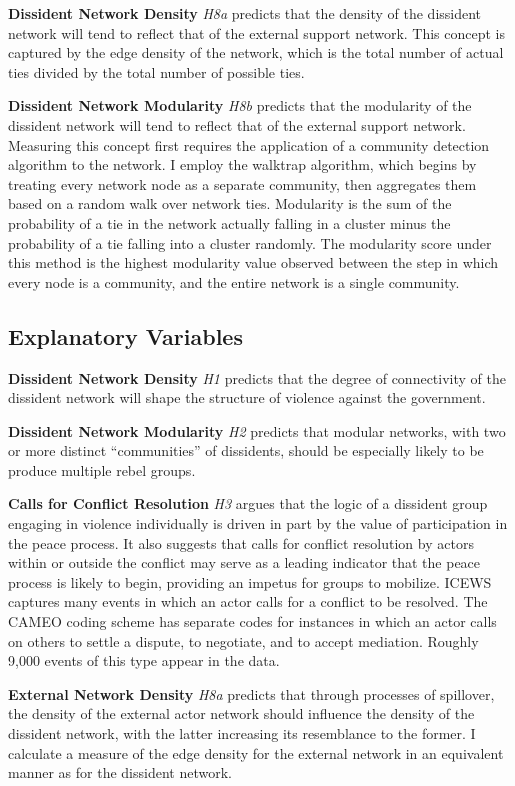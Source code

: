 \textbf{Dissident Network Density} \textit{H8a} predicts that the density of the dissident network will tend to reflect that of the external support network. This concept is captured by the edge density of the network, which is the total number of actual ties divided by the total number of possible ties.

\textbf{Dissident Network Modularity} \textit{H8b} predicts that the modularity of the dissident network will tend to reflect that of the external support network. Measuring this concept first requires the application of a community detection algorithm to the network. I employ the walktrap algorithm, which begins by treating every network node as a separate community, then aggregates them based on a random walk over network ties. Modularity is the sum of the probability of a tie in the network actually falling in a cluster minus the probability of a tie falling into a cluster randomly. The modularity score under this method is the highest modularity value observed between the step in which every node is a community, and the entire network is a single community.

\subsection{Explanatory Variables}

\textbf{Dissident Network Density} \textit{H1} predicts that the degree of connectivity of the dissident network will shape the structure of violence against the government.

\textbf{Dissident Network Modularity} \textit{H2} predicts that modular networks, with two or more distinct ``communities'' of dissidents, should be especially likely to be produce multiple rebel groups.

\textbf{Calls for Conflict Resolution} \textit{H3} argues that the logic of a dissident group engaging in violence individually is driven in part by the value of participation in the peace process. It also suggests that calls for conflict resolution by actors within or outside the conflict may serve as a leading indicator that the peace process is likely to begin, providing an impetus for groups to mobilize. ICEWS captures many events in which an actor calls for a conflict to be resolved. The CAMEO coding scheme has separate codes for instances in which an actor calls on others to settle a dispute, to negotiate, and to accept mediation. Roughly 9,000 events of this type appear in the data.

\textbf{External Network Density} \textit{H8a} predicts that through processes of spillover, the density of the external actor network should influence the density of the dissident network, with the latter increasing its resemblance to the former. I calculate a measure of the edge density for the external network in an equivalent manner as for the dissident network.

